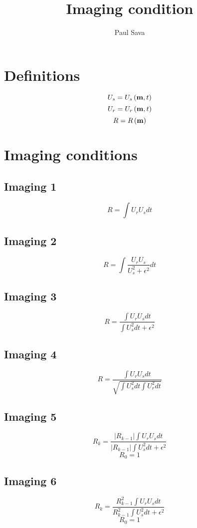 \title{Imaging condition}
\author{Paul Sava}
\maketitle

\def\mt{\left( {\bf m},t \right)}
\def\mm{\left( {\bf m}   \right)}
\def\Us{U_s}
\def\Ur{U_r}
\def\R {R  }

\section{Definitions}

\[\Us = \Us\mt \]
\[\Ur = \Ur\mt \]
\[\R  = \R \mm \]

\section{Imaging conditions}

\subsection{Imaging 1}
\[ \R = \int \Ur \Us dt \]

\subsection{Imaging 2}
\[ \R = \int \frac{\Ur \Us}{\Us^2 + \epsilon^2} dt \]

\subsection{Imaging 3}
\[ \R = \frac{\int \Ur \Us dt}{\int \Us^2 dt + \epsilon^2} \]

\subsection{Imaging 4}
\[ \R = \frac{\int \Ur \Us dt}
                {\sqrt{\int \Us^2 dt \int \Ur^2 dt}} \]

\subsection{Imaging 5}
\[ \R_k = \frac{ \left| \R_{k-1} \right| \int \Ur \Us dt}
               { \left| \R_{k-1} \right| \int \Us^2   dt + \epsilon^2}
\]
\[ \R_0 = 1 \]

\subsection{Imaging 6}
\[ \R_k = \frac{ \R_{k-1}^2 \int \Ur \Us dt}
               { \R_{k-1}^2 \int \Us^2   dt + \epsilon^2}
\]
\[ \R_0 = 1 \]


